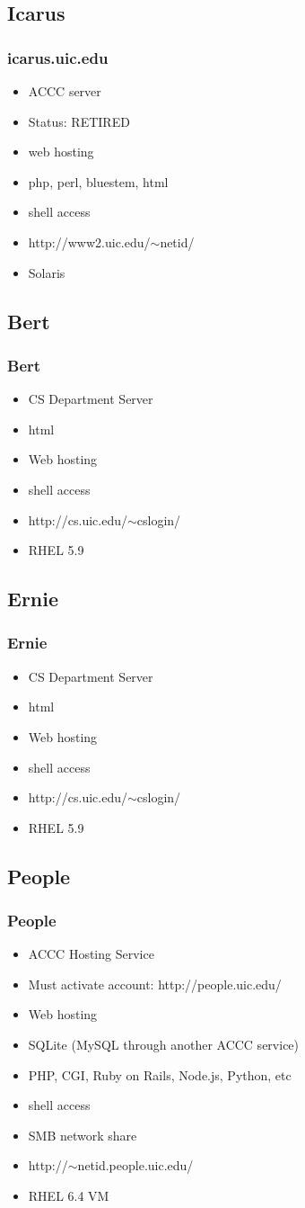 \documentclass[hyperref={pdfpagelabels=false}]{beamer}
\begin{document}
\subsection{Icarus}
\frame
{
    \frametitle{icarus.uic.edu}
    \begin{itemize}
    \item{ACCC server}
    \item{Status: RETIRED}
    \item{web hosting}
    \item{php, perl, bluestem, html}
    \item{shell access}
    \item{http://www2.uic.edu/$\sim$netid/}
    \item{Solaris}
    \end{itemize}
}
\subsection{Bert}
\frame
{
    \frametitle{Bert}
    \begin{itemize}
    \item{CS Department Server}
    \item{html}
    \item{Web hosting}
    \item{shell access}
    \item{http://cs.uic.edu/$\sim$cslogin/}
    \item{RHEL 5.9}
    \end{itemize}
}
\subsection{Ernie}
\frame
{
    \frametitle{Ernie}
    \begin{itemize}
    \item{CS Department Server}
    \item{html}
    \item{Web hosting}
    \item{shell access}
    \item{http://cs.uic.edu/$\sim$cslogin/}
    \item{RHEL 5.9}
    \end{itemize}
}
\subsection{People}
\frame
{
    \frametitle{People}
    \begin{itemize}
    \item{ACCC Hosting Service}
    \item{Must activate account: http://people.uic.edu/}
    \item{Web hosting}
    \item{SQLite (MySQL through another ACCC service)}
    \item{PHP, CGI, Ruby on Rails, Node.js, Python, etc}
    \item{shell access}
    \item{SMB network share}
    \item{http://$\sim$netid.people.uic.edu/}
    \item{RHEL 6.4 VM}
    \end{itemize}
}
\end{document}
